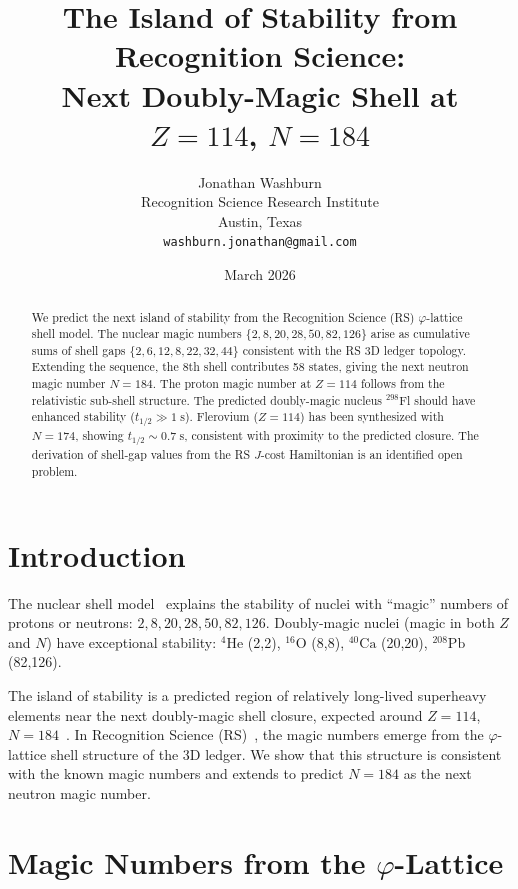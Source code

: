 \documentclass[12pt,a4paper]{article}
\title{The Island of Stability from Recognition Science:\\
Next Doubly-Magic Shell at $Z = 114$, $N = 184$}
\author{Jonathan Washburn\\
Recognition Science Research Institute\\
Austin, Texas\\
\texttt{washburn.jonathan@gmail.com}}
\date{March 2026}
\theoremstyle{definition}
\theoremstyle{remark}
\begin{document}
\maketitle

\begin{abstract}
We predict the next island of stability from the Recognition
Science (RS) $\varphi$-lattice shell model.  The nuclear magic
numbers $\{2, 8, 20, 28, 50, 82, 126\}$ arise as cumulative
sums of shell gaps $\{2, 6, 12, 8, 22, 32, 44\}$ consistent
with the RS 3D ledger topology.  Extending the sequence, the
8th shell contributes 58 states, giving the next neutron magic
number $N = 184$.  The proton magic number at $Z = 114$ follows
from the relativistic sub-shell structure.  The predicted
doubly-magic nucleus ${}^{298}$Fl should have enhanced stability
($t_{1/2} \gg 1\;\mathrm{s}$).  Flerovium ($Z=114$) has been
synthesized with $N = 174$, showing $t_{1/2}\sim 0.7\;\mathrm{s}$,
consistent with proximity to the predicted closure.  The
derivation of shell-gap values from the RS $J$-cost Hamiltonian
is an identified open problem.
\end{abstract}

\section{Introduction}
\label{sec:intro}

The nuclear shell model~\cite{MayerJensen1955} explains the
stability of nuclei with ``magic'' numbers of protons or neutrons:
$2, 8, 20, 28, 50, 82, 126$.  Doubly-magic nuclei (magic in both
$Z$ and $N$) have exceptional stability:
${}^4\mathrm{He}$ (2,2), ${}^{16}\mathrm{O}$ (8,8),
${}^{40}\mathrm{Ca}$ (20,20), ${}^{208}\mathrm{Pb}$ (82,126).

The island of stability is a predicted region of relatively
long-lived superheavy elements near the next doubly-magic shell
closure, expected around $Z = 114$, $N = 184$~\cite{Seaborg1969}.
In Recognition Science (RS)~\cite{RS_Axioms}, the magic numbers
emerge from the $\varphi$-lattice shell structure of the 3D ledger.
We show that this structure is consistent with the known magic
numbers and extends to predict $N = 184$ as the next neutron
magic number.

\section{Magic Numbers from the $\varphi$-Lattice}
\label{sec:magic}
\end{document}
